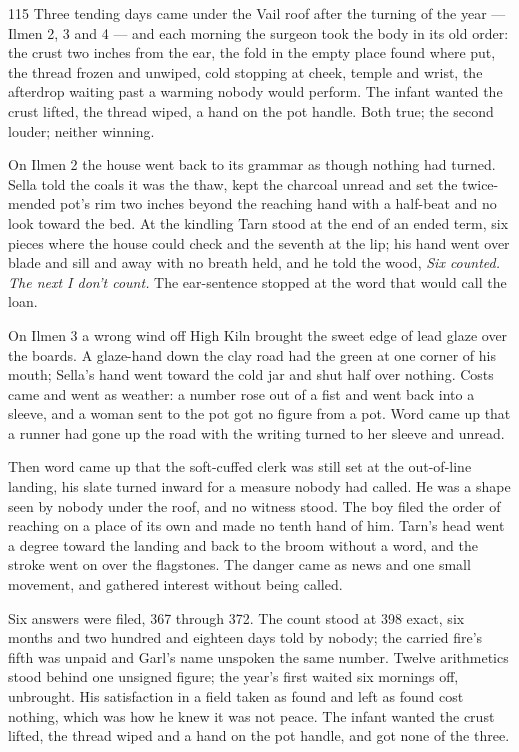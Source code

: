 \begin{CRchronicle}{115}
Three tending days came under the Vail roof after the turning of the year — Ilmen 2, 3 and 4 — and each morning the surgeon took the body in its old order: the crust two inches from the ear, the fold in the empty place found where put, the thread frozen and unwiped, cold stopping at cheek, temple and wrist, the afterdrop waiting past a warming nobody would perform. The infant wanted the crust lifted, the thread wiped, a hand on the pot handle. Both true; the second louder; neither winning.

On Ilmen 2 the house went back to its grammar as though nothing had turned. Sella told the coals it was the thaw, kept the charcoal unread and set the twice-mended pot’s rim two inches beyond the reaching hand with a half-beat and no look toward the bed. At the kindling Tarn stood at the end of an ended term, six pieces where the house could check and the seventh at the lip; his hand went over blade and sill and away with no breath held, and he told the wood, \emph{Six counted. The next I don’t count.} The ear-sentence stopped at the word that would call the loan.

On Ilmen 3 a wrong wind off High Kiln brought the sweet edge of lead glaze over the boards. A glaze-hand down the clay road had the green at one corner of his mouth; Sella’s hand went toward the cold jar and shut half over nothing. Costs came and went as weather: a number rose out of a fist and went back into a sleeve, and a woman sent to the pot got no figure from a pot. Word came up that a runner had gone up the road with the writing turned to her sleeve and unread.

Then word came up that the soft-cuffed clerk was still set at the out-of-line landing, his slate turned inward for a measure nobody had called. He was a shape seen by nobody under the roof, and no witness stood. The boy filed the order of reaching on a place of its own and made no tenth hand of him. Tarn’s head went a degree toward the landing and back to the broom without a word, and the stroke went on over the flagstones. The danger came as news and one small movement, and gathered interest without being called.

Six answers were filed, 367 through 372. The count stood at 398 exact, six months and two hundred and eighteen days told by nobody; the carried fire’s fifth was unpaid and Garl’s name unspoken the same number. Twelve arithmetics stood behind one unsigned figure; the year’s first waited six mornings off, unbrought. His satisfaction in a field taken as found and left as found cost nothing, which was how he knew it was not peace. The infant wanted the crust lifted, the thread wiped and a hand on the pot handle, and got none of the three.
\end{CRchronicle}
